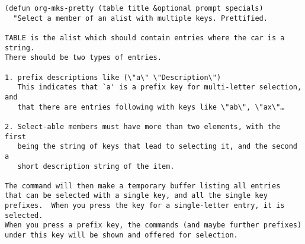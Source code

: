 \documentclass[c]{article}
\theoremstyle{plain}%
\theoremstyle{definition}
\theoremstyle{remark}
\begin{document}
\begin{verbatim}
(defun org-mks-pretty (table title &optional prompt specials)
  "Select a member of an alist with multiple keys. Prettified.

TABLE is the alist which should contain entries where the car is a string.
There should be two types of entries.

1. prefix descriptions like (\"a\" \"Description\")
   This indicates that `a' is a prefix key for multi-letter selection, and
   that there are entries following with keys like \"ab\", \"ax\"…

2. Select-able members must have more than two elements, with the first
   being the string of keys that lead to selecting it, and the second a
   short description string of the item.

The command will then make a temporary buffer listing all entries
that can be selected with a single key, and all the single key
prefixes.  When you press the key for a single-letter entry, it is selected.
When you press a prefix key, the commands (and maybe further prefixes)
under this key will be shown and offered for selection.


\end{verbatim}
\end{document}
